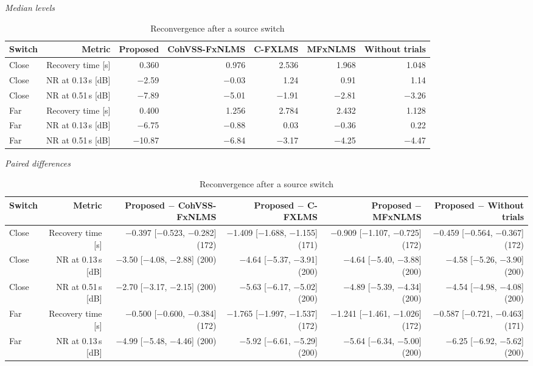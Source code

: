 \begin{table}[tbp]
\centering
\footnotesize
\setlength{\tabcolsep}{4pt}
\caption{Reconvergence after a source switch}
\label{tab:atsip-2}
\par\medskip
\textit{Median levels}\par\smallskip
\begin{tabular}{lrrrrrr}
\toprule
Switch & Metric & Proposed & CohVSS-FxNLMS & C-FXLMS & MFxNLMS & Without trials \\
\midrule
Close & Recovery time [s] & 0.360 & 0.976 & 2.536 & 1.968 & 1.048 \\
Close & NR at 0.13\,s [dB] & $-$2.59 & $-$0.03 & 1.24 & 0.91 & 1.14 \\
Close & NR at 0.51\,s [dB] & $-$7.89 & $-$5.01 & $-$1.91 & $-$2.81 & $-$3.26 \\
Far & Recovery time [s] & 0.400 & 1.256 & 2.784 & 2.432 & 1.128 \\
Far & NR at 0.13\,s [dB] & $-$6.75 & $-$0.88 & 0.03 & $-$0.36 & 0.22 \\
Far & NR at 0.51\,s [dB] & $-$10.87 & $-$6.84 & $-$3.17 & $-$4.25 & $-$4.47 \\
\bottomrule
\end{tabular}
\par\medskip
\textit{Paired differences}\par\smallskip
\begin{tabular}{lrrrrr}
\toprule
Switch & Metric & Proposed $-$ CohVSS-FxNLMS & Proposed $-$ C-FXLMS & Proposed $-$ MFxNLMS & Proposed $-$ Without trials \\
\midrule
Close & Recovery time [s] & $-$0.397 [$-$0.523, $-$0.282] (172) & $-$1.409 [$-$1.688, $-$1.155] (171) & $-$0.909 [$-$1.107, $-$0.725] (172) & $-$0.459 [$-$0.564, $-$0.367] (172) \\
Close & NR at 0.13\,s [dB] & $-$3.50 [$-$4.08, $-$2.88] (200) & $-$4.64 [$-$5.37, $-$3.91] (200) & $-$4.64 [$-$5.40, $-$3.88] (200) & $-$4.58 [$-$5.26, $-$3.90] (200) \\
Close & NR at 0.51\,s [dB] & $-$2.70 [$-$3.17, $-$2.15] (200) & $-$5.63 [$-$6.17, $-$5.02] (200) & $-$4.89 [$-$5.39, $-$4.34] (200) & $-$4.54 [$-$4.98, $-$4.08] (200) \\
Far & Recovery time [s] & $-$0.500 [$-$0.600, $-$0.384] (172) & $-$1.765 [$-$1.997, $-$1.537] (172) & $-$1.241 [$-$1.461, $-$1.026] (172) & $-$0.587 [$-$0.721, $-$0.463] (171) \\
Far & NR at 0.13\,s [dB] & $-$4.99 [$-$5.48, $-$4.46] (200) & $-$5.92 [$-$6.61, $-$5.29] (200) & $-$5.64 [$-$6.34, $-$5.00] (200) & $-$6.25 [$-$6.92, $-$5.62] (200) \\

\end{tabular}
\end{table}
